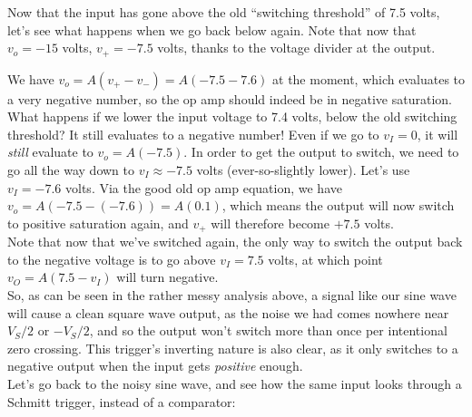 Now that the input has gone above the old ``switching threshold'' of 7.5 volts, let's see what happens when we go back below again. Note that now that $v_o = -15$ volts, $v_+ = -7.5$ volts, thanks to the voltage divider at the output.

We have $v_o = A(v_+ - v_-) = A(-7.5 - 7.6)$ at the moment, which evaluates to a very negative number, so the op amp should indeed be in negative saturation. What happens if we lower the input voltage to 7.4 volts, below the old switching threshold? It still evaluates to a negative number! Even if we go to $v_I = 0$, it will \emph{still} evaluate to $v_o = A(-7.5)$. In order to get the output to switch, we need to go all the way down to $v_I \approx -7.5$ volts (ever-so-slightly lower). Let's use $v_I = -7.6$ volts. Via the good old op amp equation, we have $v_o = A(-7.5 - (-7.6)) = A(0.1)$, which means the output will now switch to positive saturation again, and $v_+$ will therefore become $+7.5$ volts.\\

Note that now that we've switched again, the only way to switch the output back to the negative voltage is to go above $v_I = 7.5$ volts, at which point $v_O = A(7.5 - v_I)$ will turn negative.\\

So, as can be seen in the rather messy analysis above, a signal like our sine wave will cause a clean square wave output, as the noise we had comes nowhere near $V_S/2$ or $-V_S/2$, and so the output won't switch more than once per intentional zero crossing. This trigger's inverting nature is also clear, as it only switches to a negative output when the input gets \emph{positive} enough.\\

Let's go back to the noisy sine wave, and see how the same input looks through a Schmitt trigger, instead of a comparator:

\begin{comment}
Plot[{15 (Sin[x] + 1/3 Sin[25 x + \[Pi]/3]), f[x], 7.5, -7.5}, {x, 0, 
3 \[Pi]}, Filling -> {2 -> Axis}, 
PlotStyle -> {Automatic, Automatic, {Red, Dotted}, {Red, Dotted}}, 
Ticks -> {None, {-15, -7.5, 0, 7.5, 15}}, 
AxesLabel -> {"Time", "Volts"}]
\end{comment}


